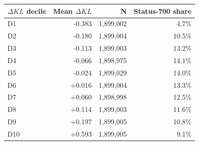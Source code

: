\begin{tabular}{lrrr}
\toprule
$\Delta KL$ decile & Mean $\Delta KL$ & N & Status-700 share \\
\midrule
D1 & -0.383 & 1,899,002 & 4.7\% \\
D2 & -0.180 & 1,899,004 & 10.5\% \\
D3 & -0.113 & 1,899,003 & 13.2\% \\
D4 & -0.066 & 1,898,975 & 14.1\% \\
D5 & -0.024 & 1,899,029 & 14.0\% \\
D6 & +0.016 & 1,899,004 & 13.3\% \\
D7 & +0.060 & 1,898,998 & 12.5\% \\
D8 & +0.114 & 1,899,003 & 11.6\% \\
D9 & +0.197 & 1,899,005 & 10.8\% \\
D10 & +0.593 & 1,899,005 & 9.1\% \\
\bottomrule
\end{tabular}
